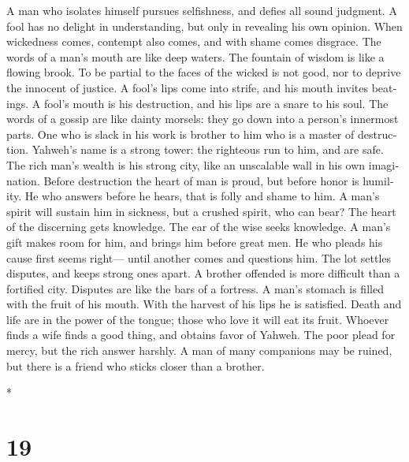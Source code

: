 \begin{paracol}{2}
\begin{otherlanguage}{english}
 A man who isolates himself pursues selfishness, and
defies all sound judgment.  A fool has no delight in
understanding, but only in revealing his own opinion. 
When wickedness comes, contempt also comes, and with shame comes
disgrace.  The words of a man's mouth are like deep
waters. The fountain of wisdom is like a flowing brook. 
To be partial to the faces of the wicked is not good, nor to deprive the
innocent of justice.  A fool's lips come into strife, and
his mouth invites beatings.  A fool's mouth is his
destruction, and his lips are a snare to his soul.  The
words of a gossip are like dainty morsels: they go down into a person's
innermost parts.  One who is slack in his work is brother
to him who is a master of destruction.  Yahweh's name is
a strong tower: the righteous run to him, and are safe. 
The rich man's wealth is his strong city, like an unscalable wall in his
own imagination.  Before destruction the heart of man is
proud, but before honor is humility.  He who answers
before he hears, that is folly and shame to him.  A man's
spirit will sustain him in sickness, but a crushed spirit, who can bear?
 The heart of the discerning gets knowledge. The ear of
the wise seeks knowledge.  A man's gift makes room for
him, and brings him before great men.  He who pleads his
cause first seems right--- until another comes and questions him.
 The lot settles disputes, and keeps strong ones apart.
 A brother offended is more difficult than a fortified
city. Disputes are like the bars of a fortress.  A man's
stomach is filled with the fruit of his mouth. With the harvest of his
lips he is satisfied.  Death and life are in the power of
the tongue; those who love it will eat its fruit. 
Whoever finds a wife finds a good thing, and obtains favor of Yahweh.
 The poor plead for mercy, but the rich answer harshly.
 A man of many companions may be ruined, but there is a
friend who sticks closer than a brother.

\end{otherlanguage}

\switchcolumn[0]*

\hypertarget{section-36}{%
\section{19}\label{section-36}}


\end{paracol}

